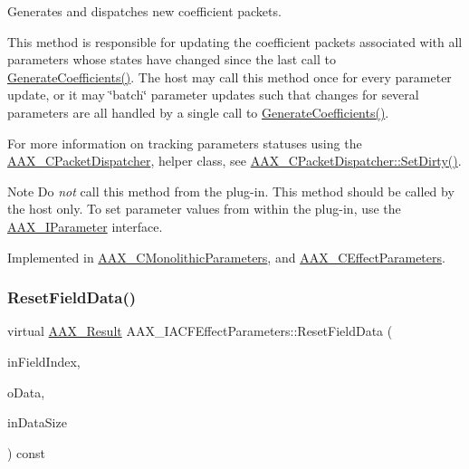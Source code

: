 Generates and dispatches new coefficient packets. 

This method is responsible for updating the coefficient packets associated with all parameters whose states have changed since the last call to \mbox{\hyperlink{a01669_a083265b008921b6114ede387711694b7}{Generate\+Coefficients()}}. The host may call this method once for every parameter update, or it may \char`\"{}batch\char`\"{} parameter updates such that changes for several parameters are all handled by a single call to \mbox{\hyperlink{a01669_a083265b008921b6114ede387711694b7}{Generate\+Coefficients()}}.

For more information on tracking parameters\textquotesingle{} statuses using the \mbox{\hyperlink{a01529}{A\+A\+X\+\_\+\+C\+Packet\+Dispatcher}}, helper class, see \mbox{\hyperlink{a01529_a6d4254a842eeee46a227ec761619efb5}{A\+A\+X\+\_\+\+C\+Packet\+Dispatcher\+::\+Set\+Dirty()}}.

\begin{DoxyNote}{Note}
Do {\itshape not} call this method from the plug-\/in. This method should be called by the host only. To set parameter values from within the plug-\/in, use the \mbox{\hyperlink{a01857}{A\+A\+X\+\_\+\+I\+Parameter}} interface. 
\end{DoxyNote}


Implemented in \mbox{\hyperlink{a01969_a626cb2aaa68c64238298acfd6db448f5}{A\+A\+X\+\_\+\+C\+Monolithic\+Parameters}}, and \mbox{\hyperlink{a01481_a2ae4c7e4ed12f2763934da50aa5730f3}{A\+A\+X\+\_\+\+C\+Effect\+Parameters}}.

\mbox{\label{a01669_a6e87e40d42c7431e52ae5ebd4f631964}} 
\subsubsection{\texorpdfstring{ResetFieldData()}{ResetFieldData()}}
{\footnotesize\ttfamily virtual \mbox{\hyperlink{a00392_a4d8f69a697df7f70c3a8e9b8ee130d2f}{A\+A\+X\+\_\+\+Result}} A\+A\+X\+\_\+\+I\+A\+C\+F\+Effect\+Parameters\+::\+Reset\+Field\+Data (\begin{DoxyParamCaption}\item[{\mbox{\hyperlink{a00392_ae807f8986143820cfb5d6da32165c9c7}{A\+A\+X\+\_\+\+C\+Field\+Index}}}]{in\+Field\+Index,  }\item[{void $\ast$}]{o\+Data,  }\item[{uint32\+\_\+t}]{in\+Data\+Size }\end{DoxyParamCaption}) const\hspace{0.3cm}{\ttfamily [pure virtual]}}



